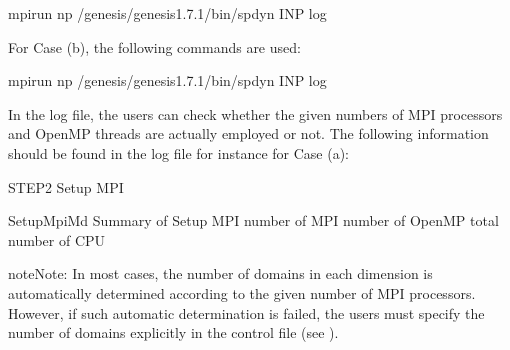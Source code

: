 \documentclass[a4paper,11pt,oneside,english]{sphinxmanual}
\begin{document}
\begin{sphinxVerbatim}[commandchars=\\\{\}]
\PYGZdl{}  
\PYGZdl{} mpirun \PYGZhy{}np  \PYGZti{}/genesis/genesis\PYGZhy{}1.7.1/bin/spdyn INP \PYGZgt{} log
\end{sphinxVerbatim}

For Case (b), the following commands are used:

\begin{sphinxVerbatim}[commandchars=\\\{\}]
\PYGZdl{}  
\PYGZdl{} mpirun \PYGZhy{}np  \PYGZti{}/genesis/genesis\PYGZhy{}1.7.1/bin/spdyn INP \PYGZgt{} log
\end{sphinxVerbatim}

In the log file, the users can check whether the given numbers of MPI processors
and OpenMP threads are actually employed or not.
The following information should be found in the log file for instance for Case (a):

\begin{sphinxVerbatim}[commandchars=\\\{\}]
\PYG{o}{[}STEP2\PYG{o}{]} Setup MPI

Setup\PYGZus{}Mpi\PYGZus{}Md\PYGZgt{} Summary of Setup MPI
  number of MPI              
  number of OpenMP             
  total number of CPU           
\end{sphinxVerbatim}

\begin{sphinxadmonition}{note}{Note:}
In most cases, the number of domains in each dimension is automatically
determined according to the given number of MPI processors.
However, if such automatic determination is failed, the users must specify
the number of domains explicitly in the control file (see {\hyperref[\detokenize{10_Boundary:boundary}]{}}).
\end{sphinxadmonition}
\end{document}
